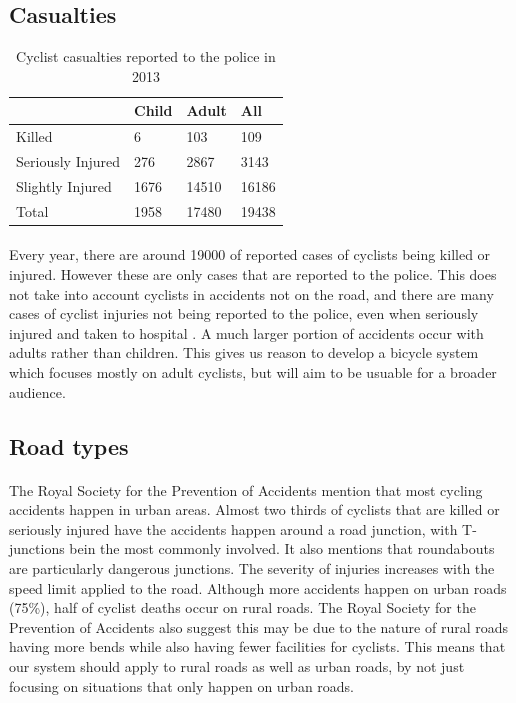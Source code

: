 \documentclass[a4paper]{report}
\begin{document}
{%

\subsection{Casualties}
\begin{table}[H]
\begin{tabular}{| l | l | l | l |}
\hline
 & \textbf{Child} & \textbf{Adult} & \textbf{All} \\ \hline
 Killed & 6 & 103 & 109 \\ \hline
 Seriously Injured & 276 & 2867 & 3143 \\ \hline
 Slightly Injured & 1676 & 14510 & 16186 \\ \hline
 Total & 1958 & 17480 & 19438 \\ \hline
\end{tabular}
\caption[Table caption text]{Cyclist casualties reported to the police in 2013 \citep{cycling_accidents}}
\label{table:casualties}
\end{table}

\paragraph{}Every year, there are around 19000 of reported cases of cyclists being killed or injured. However these are only cases that are reported to the police. This does not take into account cyclists in accidents not on the road, and there are many cases of cyclist injuries not being reported to the police, even when seriously injured and taken to hospital \citep{cycling_accidents}.
A much larger portion of accidents occur with adults rather than children. This gives us reason to develop a bicycle system which focuses mostly on adult cyclists, but will aim to be usuable for a broader audience. 
\subsection{Road types}
\paragraph{}The Royal Society for the Prevention of Accidents \cite{cycling_accidents} mention that most cycling accidents happen in urban areas. Almost two thirds of cyclists that are killed or seriously injured have the accidents happen around a road junction, with T-junctions bein the most commonly involved. It also mentions that roundabouts are particularly dangerous junctions. The severity of injuries increases with the speed limit applied to the road. Although more accidents happen on urban roads (75\%), half of cyclist deaths occur on rural roads. The Royal Society for the Prevention of Accidents \cite{rural_road_safety} also suggest this may be due to the nature of rural roads having more bends while also having fewer facilities for cyclists. This means that our system should apply to rural roads as well as urban roads, by not just focusing on situations that only happen on urban roads. 
}
\end{document}
